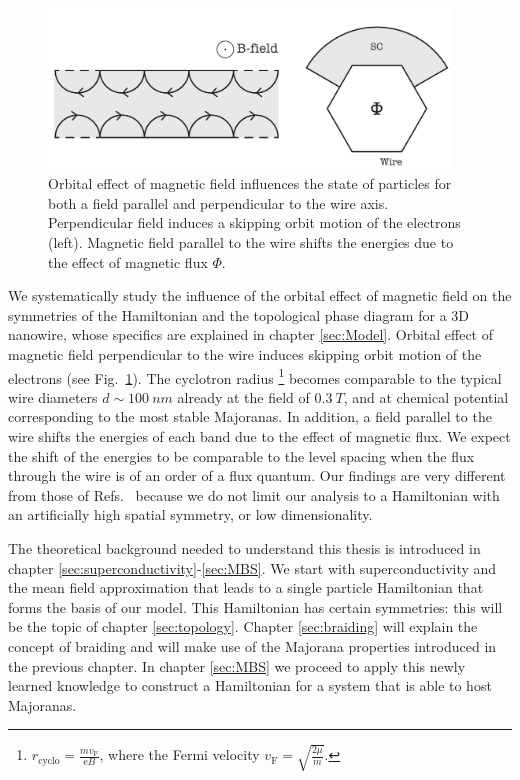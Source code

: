 \begin{figure}
\begin{centering}
\includegraphics[width=0.95\textwidth]{chapter_introduction/figures/wires.pdf}
\par\end{centering}
\caption{Orbital effect of magnetic field influences the state of particles for both a field parallel and perpendicular to the wire axis.
Perpendicular field induces a skipping orbit motion of the electrons (left).
Magnetic field parallel to the wire shifts the energies due to the effect of magnetic flux $\Phi$.
\label{fig:wire}}
\end{figure}

We systematically study the influence of the orbital effect of magnetic field on the symmetries of the Hamiltonian and the topological phase diagram for a 3D nanowire, whose specifics are explained in chapter \ref{sec:Model}.
Orbital effect of magnetic field perpendicular to the wire induces skipping orbit motion of the electrons (see Fig.~\ref{fig:wire}).
The cyclotron radius \footnote{$r_{\textrm{cyclo}}=\frac{mv_{\textrm{F}}}{\textrm{e}B}$, where the Fermi velocity $v_{\textrm{F}}=\sqrt{\frac{2\mu}{m}}$.} becomes comparable to the typical wire diameters $d\sim\SI{100}{nm}$ already at the field of $\SI{0.3}{T}$, and at chemical potential corresponding to the most stable Majoranas.
In addition, a field parallel to the wire shifts the energies of each band due to the effect of magnetic flux.
We expect the shift of the energies to be comparable to the level spacing when the flux through the wire is of an order of a flux quantum.
Our findings are very different from those of Refs.~\cite{Osca2015a,Lim2012,SooLim2013} because we do not limit our analysis to a Hamiltonian with an artificially high spatial symmetry, or low dimensionality.

The theoretical background needed to understand this thesis is introduced in chapter \ref{sec:superconductivity}-\ref{sec:MBS}.
We start with superconductivity and the mean field approximation that leads to a single particle Hamiltonian that forms the basis of our model.
This Hamiltonian has certain symmetries: this will be the topic of chapter \ref{sec:topology}.
Chapter \ref{sec:braiding} will explain the concept of braiding and will make use of the Majorana properties introduced in the previous chapter.
In chapter \ref{sec:MBS} we proceed to apply this newly learned knowledge to construct a Hamiltonian for a system that is able to host Majoranas.

